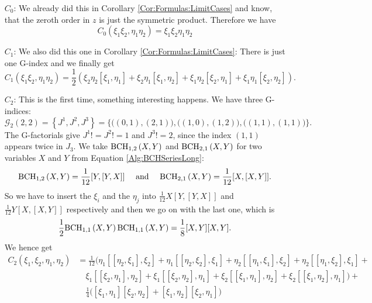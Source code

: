 \begin{itemize}
	\item[$C_0$:]
	We already did this in Corollary \ref{Cor:Formulas:LimitCases} and know, 
	that the zeroth order in $z$ is just the symmetric product. Therefore we 
	have
	\begin{equation*}
		C_0(\xi_1 \xi_2, \eta_1 \eta_2)
		=
		\xi_1 \xi_2 \eta_1 \eta_2
	\end{equation*}
	
	\item[$C_1$:]
	We also did this one in Corollary \ref{Cor:Formulas:LimitCases}: There is 
	just one G-index and we finally get
	\begin{equation*}
		C_1(\xi_1 \xi_2, \eta_1 \eta_2)
		=
		\frac{1}{2} \left(
			\xi_2 \eta_2 [\xi_1, \eta_1] +
			\xi_2 \eta_1 [\xi_1, \eta_2] +
			\xi_1 \eta_2 [\xi_2, \eta_1] +
			\xi_1 \eta_1 [\xi_2, \eta_2]
		\right).
	\end{equation*}
	
	\item[$C_2$:]
	This is the first time, something interesting happens. We have three 
	G-indices:
	\begin{equation*}
		\mathcal{G}_2(2,2) 
		=
		\left\{ J^1, J^2, J^3 \right\}
		= 
		\big\{ 
			\big((0,1), (2,1)\big), 
			\big((1,0), (1,2)\big), 
			\big((1,1), (1,1)\big) 
		\big\}.
	\end{equation*}
	The G-factorials give $J^1! = J^2! = 1$ and $J^3! = 2$, since the index 
	$(1,1)$ appears twice in $J_3$. We take $\mathrm{BCH}_{1, 2}\left(X, Y\right)$ and 
	$\mathrm{BCH}_{2, 1}\left(X, Y\right)$ for two variables $X$ and $Y$ from Equation 
	\eqref{Alg:BCHSeriesLong}:
	\begin{equation*}
		\mathrm{BCH}_{1, 2}\left(X, Y\right)
		=
		\frac{1}{12}[Y, [Y, X]]
		\quad \text{ and } \quad
		\mathrm{BCH}_{2, 1}\left(X, Y\right)
		=
		\frac{1}{12}[X, [X, Y]].
	\end{equation*}
	So we have to insert the $\xi_i$ and the $\eta_j$ into $\frac{1}{12} 
	X [Y, [Y, X]]$ and $\frac{1}{12} Y [X, [X, Y]]$ respectively and then 
	we go on with the last one, which is
	\begin{equation*}
		\frac{1}{2}
		\mathrm{BCH}_{1, 1}\left(X, Y\right)
		\mathrm{BCH}_{1, 1}\left(X, Y\right)
		=
		\frac{1}{8}
		[X, Y][X, Y].
	\end{equation*}
	We hence get
	\begin{align*}
		C_2(\xi_1, \xi_2, \eta_1, \eta_2) 
		& = 
		\frac{1}{12}
		\big( 
			\eta_1 [[\eta_2, \xi_1],\xi_2] + 
			\eta_1 [[\eta_2, \xi_2],\xi_1] + 
			\eta_2 [[\eta_1, \xi_1],\xi_2] + 
			\eta_2 [[\eta_1, \xi_2],\xi_1] +
		\\
		& \quad
			\xi_1 [[\xi_2, \eta_1],\eta_2] + 
			\xi_1 [[\xi_2, \eta_2],\eta_1] + 
			\xi_2 [[\xi_1, \eta_1],\eta_2] + 
			\xi_2 [[\xi_1, \eta_2],\eta_1] 
 		\big) +
 		\\
 		& \quad
		\frac{1}{4} 
		\big( 
			[\xi_1,\eta_1][\xi_2,\eta_2] + 
			[\xi_1,\eta_2][\xi_2,\eta_1] 
		\big)
	\end{align*}
	

\end{itemize}
